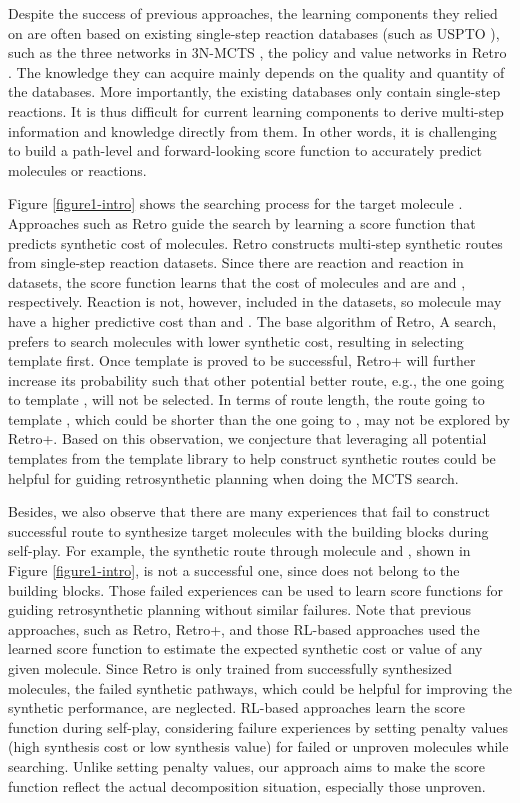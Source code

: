 \documentclass[sn-mathphys,Numbered]{sn-jnl}
\begin{document}
Despite the success of previous approaches, the learning components they relied on are often based on existing single-step reaction databases (such as USPTO \citep{lowe2017}), such as the three networks in 3N-MCTS \citep{segler2018}, the policy and value networks in Retro \citep{retro2020}. The knowledge they can acquire mainly depends on the quality and quantity of the databases.
More importantly, the existing databases only contain single-step reactions. 
It is thus difficult for current learning components to derive multi-step information and knowledge directly from them. In other words, it is challenging to build a path-level and forward-looking score function to accurately predict molecules or reactions.


Figure \ref{figure1-intro} shows the searching process for the target molecule . Approaches such as Retro guide the search by learning a score function that predicts synthetic cost of molecules. Retro constructs multi-step synthetic routes from single-step reaction datasets. Since there are reaction  and reaction  in datasets, the score function learns that the cost of molecules  and  are  and , respectively. Reaction  is not, however, included in the datasets, so molecule  may have a higher predictive cost than  and . The base algorithm of Retro, A search, prefers to search molecules with lower synthetic cost, resulting in selecting template  first. Once template  is proved to be successful, Retro+ will further increase its probability such that other potential better route, e.g., the one going to template , will not be selected.
In terms of route length, the route going to template , which could be shorter than the one going to , may not be explored by Retro+.
Based on this observation, we conjecture that leveraging all potential templates from the template library to help construct synthetic routes could be helpful for guiding retrosynthetic planning when doing the MCTS search.

Besides, we also observe that there are many experiences that fail to construct successful route to synthesize target molecules with the building blocks during self-play. For example, the synthetic route through molecule  and , shown in Figure \ref{figure1-intro}, is not a successful one, since  does not belong to the building blocks. Those failed experiences can be used to learn score functions for guiding retrosynthetic planning without similar failures.
Note that previous approaches, such as Retro, Retro+, and those RL-based approaches \citep{schreck2019, RL2} used the learned score function to estimate the expected synthetic cost or value of any given molecule. 
Since Retro is only trained from successfully synthesized molecules, the failed synthetic pathways, which could be helpful for improving the synthetic performance, are neglected. 
RL-based approaches learn the score function during self-play, considering failure experiences by setting penalty values (high synthesis cost or low synthesis value) for failed or unproven molecules while searching.
Unlike setting penalty values, our approach aims to make the score function reflect the actual decomposition situation, especially those unproven.
\end{document}
